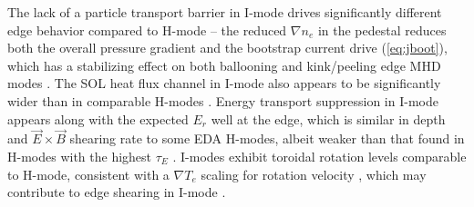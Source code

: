 \begin{figure}
 \pushtooutside
\end{figure}

The lack of a particle transport barrier in I-mode drives significantly different edge behavior compared to H-mode -- the reduced $\nabla n_e$ in the pedestal reduces both the overall pressure gradient and the bootstrap current drive (\cref{eq:jboot}), which has a stabilizing effect on both ballooning and kink/peeling edge MHD modes \cite{Hughes2013}.  The SOL heat flux channel in I-mode also appears to be significantly wider than in comparable H-modes \cite{Whyte2010,Hubbard2012b}.  Energy transport suppression in I-mode appears along with the expected $E_r$ well at the edge, which is similar in depth and $\vec{E}\times\vec{B}$ shearing rate to some EDA H-modes, albeit weaker than that found in H-modes with the highest $\tau_E$ \cite{McDermott2009,Theiler2014}.  I-modes exhibit toroidal rotation levels comparable to H-mode, consistent with a $\nabla T_e$ scaling for rotation velocity \cite{Rice2011}, which may contribute to edge shearing in I-mode \cite{McDermott2009}.

